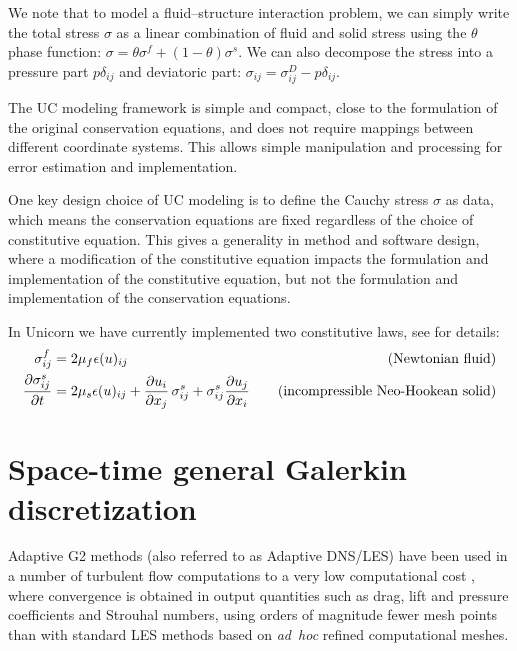 We note that to model a fluid--structure interaction problem, we can
simply write the total stress $\sigma$ as a linear combination of
fluid and solid stress using the $\theta$ phase function: $\sigma
= \theta \sigma^f + (1 - \theta) \sigma^s$. We can also decompose the
stress into a pressure part $p\delta_{ij}$ and deviatoric part: $\sigma_{ij} = \sigma^D_{ij} - p \delta_{ij}$.

The UC modeling framework is simple and compact, close to the
formulation of the original conservation equations, and does not
require mappings between different coordinate systems. This allows
simple manipulation and processing for error estimation and
implementation.

One key design choice of UC modeling is to define the Cauchy stress
$\sigma$ as data, which means the conservation equations are fixed
regardless of the choice of constitutive equation. This gives a
generality in method and software design, where a modification of the
constitutive equation impacts the formulation and implementation of
the constitutive equation, but not the formulation and implementation
of the conservation equations.

In Unicorn we have currently implemented two constitutive laws, see \citet{HoffmanJanssonStockli2011} for details:
\begin{align}
\sigma^f_{ij} &= 2\mu_f \epsilon(u)_{ij} \quad &\text{(Newtonian fluid)}\\
\frac{\partial \sigma^s_{ij}}{\partial t} &= 2\mu_s \epsilon(u)_{ij} + \frac{\partial u_i}{\partial x_j} \thinspace \sigma^s_{ij} + \sigma^s_{ij} \frac{\partial u_j}{\partial x_i} \quad &\text{(incompressible Neo-Hookean solid)}
\end{align}

\section{Space-time general Galerkin discretization}

Adaptive G2 methods (also referred to as Adaptive DNS/LES) have been
used in a number of turbulent flow computations to a very low
computational cost
\citep{Hoffman2005,HoffmanJohnson2006b,Hoffman2006,HoffmanJohnson2007,Hoffman2009,HoffmanJansson2009,VilelaJanssonEtAl2010},
where convergence is obtained in output quantities such as drag, lift
and pressure coefficients and Strouhal numbers, using orders of
magnitude fewer mesh points than with standard LES methods based on
\emph{ad~hoc} refined computational meshes.

